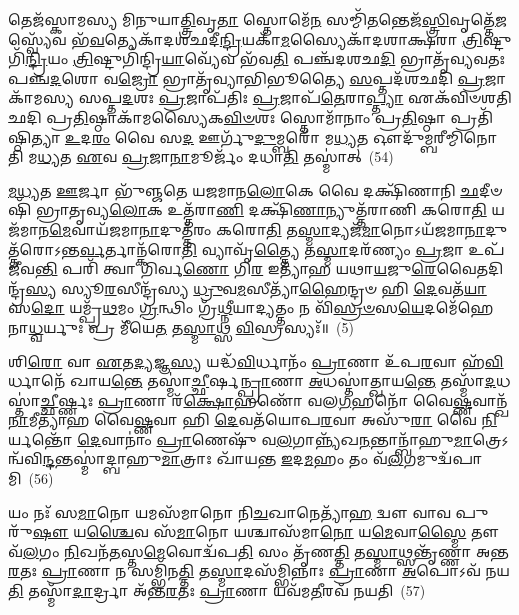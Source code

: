 𑌤𑍇𑌜᳴𑌸𑍍𑌕𑌾𑌮𑌸𑍍𑌯 𑌮𑌿𑌨𑍁𑌯𑌾\-\ul{𑌤𑍍𑌤𑍍𑌰𑌿}\-𑌵𑍃\-\ul{𑌤𑌾} 𑌸𑍍𑌤𑍋𑌮𑍇᳴\-\ul{𑌨} 𑌸𑌮𑍍𑌮𑌿᳴\-\ul{𑌤}\-𑌨𑍍𑌤𑍇𑌜᳴\-\ul{𑌸𑍍𑌤𑍍𑌰𑌿}\-𑌵𑍃𑌤𑍍𑌤𑍇᳴\-\ul{𑌜}\-𑌸𑍍𑌵𑍍𑌯𑍇᳴𑌵 𑌭᳴\-\ul{𑌵}\-𑌤𑍍𑌯𑍇𑌕𑌾᳴\-𑌦𑌶𑌛𑌦𑍀\-\ul{𑌨𑍍𑌦𑍍𑌰𑌿}\-𑌯𑌕𑌾᳴\-\ul{𑌮}\-𑌸𑍍𑌯𑍈𑌕𑌾᳴\-𑌦𑌶𑌾𑌕𑍍𑌷𑌰𑌾 \ul{𑌤𑍍𑌰𑌿}\-𑌷𑍍𑌟𑍁𑌗𑌿᳴\-\ul{𑌨𑍍𑌦𑍍𑌰𑌿}\-𑌯𑌂 \ul{𑌤𑍍𑌰𑌿}\-𑌷𑍍𑌟𑍁𑌗𑌿᳴𑌨𑍍𑌦𑍍𑌰𑌿\-\ul{𑌯𑌾}\-𑌵𑍍𑌯𑍇᳴𑌵 𑌭᳴𑌵\-\ul{𑌤𑌿} 𑌪𑌞𑍍𑌚᳴𑌦𑌶𑌛\-\ul{𑌦𑌿} 𑌭𑍍𑌰𑌾𑌤𑍃᳴𑌵𑍍𑌯𑌵𑌤𑌃 𑌪𑌞𑍍𑌚\-\ul{𑌦}\-𑌶𑍋 𑌵\-\ul{𑌜𑍍𑌰𑍋} 𑌭𑍍𑌰𑌾𑌤𑍃᳴𑌵𑍍𑌯𑌾𑌭𑌿𑌭𑍂𑌤𑍍𑌯𑍈 \ul{𑌸}\-𑌪𑍍𑌤𑌦᳴𑌶𑌛𑌦𑌿 \ul{𑌪𑍍𑌰}\-𑌜𑌾𑌕𑌾᳴𑌮𑌸𑍍𑌯 𑌸𑌪𑍍𑌤\-\ul{𑌦}\-𑌶𑌃 \ul{𑌪𑍍𑌰}\-𑌜𑌾𑌪᳴𑌤𑌿𑌃 \ul{𑌪𑍍𑌰}\-𑌜𑌾𑌪᳴\-\ul{𑌤𑍇}\-𑌰𑌾\-\ul{𑌪𑍍𑌤𑍍𑌯𑌾} 𑌏𑌕᳴𑌵𑌿𑍞𑌶𑌤𑌿𑌛𑌦𑌿 𑌪𑍍𑌰\-\ul{𑌤𑌿}\-𑌷𑍍𑌠𑌾𑌕𑌾᳴𑌮𑌸𑍍𑌯𑍈𑌕\-\ul{𑌵𑌿}\-\-\ul{𑍞}\-𑌶𑌃 𑌸𑍍𑌤𑍋𑌮𑌾᳴𑌨𑌾𑌂 𑌪𑍍𑌰\-\ul{𑌤𑌿}\-𑌷𑍍𑌠𑌾 𑌪𑍍𑌰𑌤𑌿᳴𑌷𑍍𑌠𑌿𑌤𑍍𑌯𑌾 \ul{𑌉}\-𑌦\-\ul{𑌰𑌂} 𑌵𑍈 𑌸\-\ul{𑌦} 𑌊𑌰𑍍𑌗𑍁᳴\-\ul{𑌦𑍁}\-𑌮𑍍𑌬𑌰𑍋᳴ 𑌮\-\ul{𑌧𑍍𑌯}\-𑌤 𑌔𑌦𑍁᳴𑌮𑍍𑌬𑌰𑍀𑌮𑍍𑌮𑌿𑌨𑍋𑌤𑌿 𑌮\-\ul{𑌧𑍍𑌯}\-𑌤 \ul{𑌏}\-𑌵 \ul{𑌪𑍍𑌰}\-𑌜𑌾\-\ul{𑌨𑌾}\-𑌮𑍂𑌰𑍍𑌜𑌂᳴ 𑌦𑌧𑌾\-\ul{𑌤𑌿} 𑌤𑌸𑍍𑌮𑌾॑𑌤𑍍~(54)

\-\ul{𑌮}\-\-\ul{𑌧𑍍𑌯}\-𑌤 \ul{𑌊}\-𑌰𑍍𑌜𑌾 𑌭𑍁᳴𑌞𑍍𑌜𑌤𑍇 𑌯𑌜𑌮𑌾𑌨\-\ul{𑌲𑍋}\-𑌕𑍇 𑌵𑍈 𑌦𑌕𑍍𑌷𑌿᳴𑌣𑌾𑌨𑌿 \ul{𑌛}\-𑌦𑍀𑍞𑌷𑌿᳴ 𑌭𑍍𑌰𑌾𑌤𑍃𑌵𑍍𑌯\-\ul{𑌲𑍋}\-𑌕 𑌉𑌤𑍍𑌤᳴𑌰𑌾\-\ul{𑌣𑌿} 𑌦𑌕𑍍𑌷𑌿᳴\-\ul{𑌣𑌾}\-𑌨𑍍𑌯𑍁𑌤𑍍𑌤᳴𑌰𑌾𑌣𑌿 𑌕𑌰𑍋\-\ul{𑌤𑌿} 𑌯𑌜᳴𑌮𑌾𑌨\-\ul{𑌮𑍇}\-𑌵𑌾𑌯᳴𑌜𑌮𑌾\-\ul{𑌨𑌾}\-𑌦𑍁𑌤𑍍𑌤᳴𑌰𑌂 𑌕𑌰𑍋\-\ul{𑌤𑌿} 𑌤\-\ul{𑌸𑍍𑌮𑌾}\-𑌦𑍍𑌯𑌜᳴\-\ul{𑌮𑌾}\-𑌨𑍋\-𑌽𑌯᳴𑌜𑌮𑌾\-\ul{𑌨𑌾}\-𑌦𑍁𑌤𑍍𑌤᳴𑌰𑍋\-𑌽𑌨𑍍𑌤\-\ul{𑌰𑍍𑌵}\-𑌰𑍍𑌤𑌾𑌨𑍍𑌕᳴𑌰𑍋\-\ul{𑌤𑌿} 𑌵𑍍𑌯𑌾𑌵𑍃᳴\-\ul{𑌤𑍍𑌤𑍍𑌯𑍈} 𑌤\-\ul{𑌸𑍍𑌮𑌾}\-𑌦𑌰᳴𑌣𑍍𑌯𑌂 \ul{𑌪𑍍𑌰}\-𑌜𑌾 𑌉𑌪᳴ 𑌜𑍀𑌵\-\ul{𑌨𑍍𑌤𑌿} 𑌪𑌰𑌿᳴ 𑌤𑍍𑌵𑌾 𑌗𑌿𑌰𑍍𑌵\-\ul{𑌣𑍋} 𑌗𑌿\-\ul{𑌰} 𑌇𑌤𑍍𑌯𑌾᳴𑌹 𑌯𑌥𑌾\-\ul{𑌯}\-𑌜𑍁\-\ul{𑌰𑍇}\-𑌵𑍈𑌤𑌦𑌿𑌨𑍍𑌦𑍍𑌰᳴\-\ul{𑌸𑍍𑌯} 𑌸𑍍𑌯𑍂\-\ul{𑌰}\-𑌸𑍀𑌨𑍍𑌦𑍍𑌰᳴𑌸𑍍𑌯 \ul{𑌧𑍍𑌰𑍁}\-𑌵\-\ul{𑌮}\-𑌸𑍀𑌤𑍍𑌯𑌾᳴\-\ul{𑌹𑍈}\-𑌨𑍍𑌦𑍍𑌰𑍞 𑌹𑌿 \ul{𑌦𑍇}\-𑌵𑌤᳴\-\ul{𑌯𑌾} 𑌸\-\ul{𑌦𑍋} 𑌯𑌮𑍍𑌪𑍍𑌰᳴\-\ul{𑌥}\-𑌮𑌂 \ul{𑌗𑍍𑌰}\-𑌨𑍍𑌥𑌿𑌂 𑌗𑍍𑌰᳴\-\ul{𑌥𑍍𑌨𑍀}\-𑌯𑌾𑌦𑍍𑌯𑌤𑍍𑌤𑌂 𑌨 𑌵𑌿᳴\-\ul{𑌸𑍍𑌰}\-\-\ul{𑍞}\-𑌸\-\ul{𑌯𑍇}\-𑌦𑌮𑍇᳴𑌹𑍇𑌨𑌾\-\ul{𑌧𑍍𑌵}\-𑌰𑍍𑌯𑍁𑌃 𑌪𑍍𑌰 𑌮𑍀᳴𑌯𑍇\-\ul{𑌤} 𑌤\-\ul{𑌸𑍍𑌮𑌾}\-𑌥𑍍𑌸 \ul{𑌵𑌿}\-𑌸𑍍𑌰𑌸𑍍𑌯𑌃᳴॥~(5)

{\anuvakamend[{𑌅𑌪᳴𑌹\-\ul{𑌤𑍍𑌯𑍈} 𑌤𑌸𑍍𑌮𑌾॑𑌤𑍍𑌪𑌿𑌤𑍃𑌦𑍇\-\ul{𑌵}\-𑌤𑍍𑌯᳴𑌨𑍍𑌤𑍇\-\ul{𑌨𑍈}\-𑌵 𑌨𑌵᳴𑌛\-\ul{𑌦𑌿} 𑌤\-\ul{𑌸𑍍𑌮𑌾}\-𑌥𑍍𑌸\-\ul{𑌦𑌃} 𑌪𑌞𑍍𑌚᳴𑌦𑌶 𑌚}]}%

𑌶𑌿\-\ul{𑌰𑍋} 𑌵𑌾 \ul{𑌏}\-𑌤\-\ul{𑌦𑍍𑌯}\-𑌜𑍍𑌞\-\ul{𑌸𑍍𑌯} 𑌯𑌦𑍍𑌧᳴\-\ul{𑌵𑌿}\-𑌰𑍍𑌧𑌾𑌨𑌂᳴ \ul{𑌪𑍍𑌰𑌾}\-𑌣𑌾 𑌉᳴𑌪\-\ul{𑌰}\-𑌵𑌾 𑌹᳴\-\ul{𑌵𑌿}\-𑌰𑍍𑌧𑌾𑌨𑍇᳴ 𑌖𑌾𑌯\-\ul{𑌨𑍍𑌤𑍇} 𑌤𑌸𑍍𑌮𑌾॑\-\ul{𑌚𑍍𑌛𑍀}\-𑌰𑍍\mbox{}𑌷\-\ul{𑌨𑍍𑌪𑍍𑌰𑌾}\-𑌣𑌾 \ul{𑌅}\-𑌧𑌸𑍍𑌤𑌾॑𑌤𑍍𑌖𑌾𑌯\-\ul{𑌨𑍍𑌤𑍇} 𑌤𑌸𑍍𑌮𑌾᳴\-\ul{𑌦}\-𑌧𑌸𑍍𑌤𑌾॑\-\ul{𑌚𑍍𑌛𑍀}\-𑌰𑍍𑌷𑍍𑌣𑌃 \ul{𑌪𑍍𑌰𑌾}\-𑌣𑌾 𑌰᳴\-\ul{𑌕𑍍𑌷𑍋}\-𑌹𑌣𑍋᳴ 𑌵𑌲\-\ul{𑌗}\-𑌹𑌨𑍋᳴ 𑌵𑍈\-\ul{𑌷𑍍𑌣}\-𑌵𑌾𑌨𑍍𑌖᳴\-\ul{𑌨𑌾}\-𑌮𑍀𑌤𑍍𑌯𑌾᳴𑌹 𑌵𑍈\-\ul{𑌷𑍍𑌣}\-𑌵𑌾 𑌹𑌿 \ul{𑌦𑍇}\-𑌵𑌤᳴𑌯𑍋𑌪\-\ul{𑌰}\-𑌵𑌾 𑌅𑌸𑍁᳴\-\ul{𑌰𑌾} 𑌵𑍈 \ul{𑌨𑌿}\-𑌰𑍍𑌯𑌨𑍍𑌤𑍋᳴ \ul{𑌦𑍇}\-𑌵𑌾𑌨𑌾𑌂॑ \ul{𑌪𑍍𑌰𑌾}\-𑌣𑍇𑌷𑍁᳴ 𑌵\-\ul{𑌲}\-𑌗𑌾𑌨𑍍𑌨𑍍𑌯᳴𑌖\-\ul{𑌨}\-𑌨𑍍𑌤𑌾𑌨𑍍𑌬𑌾᳴𑌹𑍁\-\ul{𑌮𑌾}\-𑌤𑍍𑌰𑍇\-𑌽𑌨𑍍𑌵᳴𑌵𑌿\-\ul{𑌨𑍍𑌦}\-𑌨𑍍𑌤𑌸𑍍𑌮𑌾॑𑌦𑍍𑌬𑌾𑌹𑍁\-\ul{𑌮𑌾}\-𑌤𑍍𑌰𑌾𑌃 𑌖𑌾᳴𑌯𑌨𑍍𑌤 \ul{𑌇}\-𑌦\-\ul{𑌮}\-𑌹𑌂 𑌤𑌂 𑌵᳴\-\ul{𑌲}\-𑌗𑌮𑍁𑌦𑍍𑌵᳴𑌪𑌾𑌮𑌿~(56)

𑌯𑌂 𑌨𑌃᳴ 𑌸\-\ul{𑌮𑌾}\-𑌨𑍋 𑌯𑌮𑌸᳴𑌮𑌾𑌨𑍋 𑌨𑌿\-\ul{𑌚}\-𑌖𑌾𑌨𑍇𑌤𑍍𑌯𑌾᳴\-\ul{𑌹} 𑌦𑍍𑌵𑍗 𑌵𑌾𑌵 𑌪𑍁𑌰𑍁᳴\-\ul{𑌷𑍗} 𑌯\-\ul{𑌶𑍍𑌚𑍈}\-𑌵 𑌸᳴\-\ul{𑌮𑌾}\-𑌨𑍋 𑌯𑌶𑍍𑌚𑌾𑌸᳴𑌮𑌾\-\ul{𑌨𑍋} 𑌯\-\ul{𑌮𑍇}\-𑌵𑌾\-\ul{𑌸𑍍𑌮𑍈} 𑌤𑍗 𑌵᳴\-\ul{𑌲}\-𑌗𑌂 \ul{𑌨𑌿}\-𑌖𑌨᳴\-\ul{𑌤}\-𑌸𑍍𑌤\-\ul{𑌮𑍇}\-𑌵𑍋𑌦𑍍𑌵᳴𑌪\-\ul{𑌤𑌿} 𑌸𑌂 𑌤𑍃᳴𑌣\-\ul{𑌤𑍍𑌤𑌿} 𑌤\-\ul{𑌸𑍍𑌮𑌾}\-𑌥𑍍𑌸𑌨𑍍𑌤𑍃᳴𑌣𑍍𑌣𑌾 𑌅𑌨𑍍𑌤\-\ul{𑌰}\-𑌤𑌃 \ul{𑌪𑍍𑌰𑌾}\-𑌣𑌾 𑌨 𑌸𑌮𑍍𑌭𑌿᳴𑌨\-\ul{𑌤𑍍𑌤𑌿} 𑌤\-\ul{𑌸𑍍𑌮𑌾}\-𑌦𑌸᳴𑌮𑍍𑌭𑌿𑌨𑍍𑌨𑌾𑌃 \ul{𑌪𑍍𑌰𑌾}\-𑌣𑌾 \ul{𑌅}\-𑌪𑍋\-𑌽𑌵᳴ 𑌨𑌯\-\ul{𑌤𑌿} 𑌤𑌸𑍍𑌮𑌾᳴\-\ul{𑌦𑌾}\-𑌰𑍍𑌦𑍍𑌰𑌾 𑌅᳴𑌨𑍍𑌤\-\ul{𑌰}\-𑌤𑌃 \ul{𑌪𑍍𑌰𑌾}\-𑌣𑌾 𑌯𑌵᳴𑌮\-\ul{𑌤𑍀}\-𑌰𑌵᳴ 𑌨𑌯𑌤𑌿~(57)

